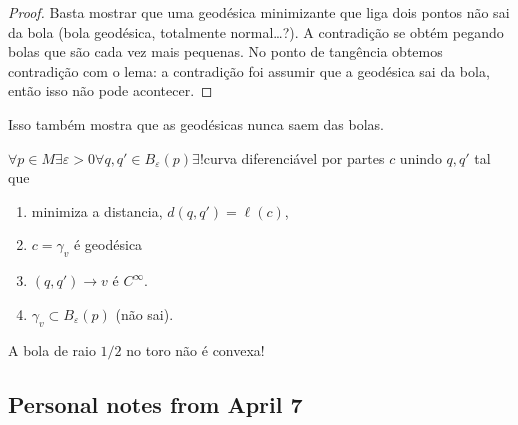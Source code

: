 \begin{proof}\leavevmode
Basta mostrar que uma geodésica minimizante que liga dois pontos não sai da bola (bola geodésica, totalmente normal…?). A contradição se obtém pegando bolas que são cada vez mais pequenas. No ponto de tangência obtemos contradição com o lema: a contradição foi assumir que a geodésica sai da bola, então isso não pode acontecer.
\end{proof}

\begin{remark}\leavevmode
	Isso também mostra que as geodésicas nunca saem das bolas.
\end{remark}

\begin{coro}\leavevmode
\(\forall p \in M \exists  \varepsilon>0 \forall  q,q' \in B_\varepsilon(p) \exists !\)curva diferenciável por partes \(c\) unindo \(q,q'\) tal que
\begin{enumerate}
\item minimiza a distancia, \(d(q,q') = \ell(c)\),
\item \(c=\gamma_v\) é geodésica
\item \((q,q') \longrightarrow v \) é \(C^\infty\).
\item \(\gamma_v \subset B_\varepsilon (p)\) (não sai).
\end{enumerate}
\end{coro}

\begin{example}\leavevmode
A bola de raio \(1/2\) no toro não é convexa!
\end{example}

\subsection{Personal notes from April 7}


